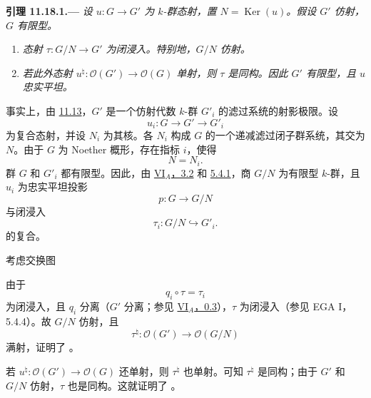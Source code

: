 \medskip
{}\label{lem:sga3-VIB-11.18.1}%
\noindent\textbf{引理 11.18.1.---}
\emph{设 \(u:G\to G'\) 为 \(k\)-群态射，置 \(N=\operatorname{Ker}(u)\)。假设 \(G'\) 仿射，\(G\) 有限型。}
\begin{enumerate}
\item[\textup{\SGAInlineRefTarget{lem:sga3-VIB-11.18.1:item:i}(i)}]
  \label{concl:sga3-VIB-11.18.1-i}%
  \emph{态射 \(\tau:G/N\to G'\) 为闭浸入。特别地，\(G/N\) 仿射。}

\item[\textup{(ii)}]
  \label{concl:sga3-VIB-11.18.1-ii}%
  \emph{若此外态射 \(u^\natural:\mathcal O(G')\to\mathcal O(G)\) 单射，则 \(\tau\) 是同构。因此 \(G'\) 有限型，且 \(u\) 忠实平坦。}
\end{enumerate}

事实上，由 \hyperref[prop:sga3-VIB-11.13]{11.13}，\(G'\) 是一个仿射代数 \(k\)-群 \(G'_i\) 的滤过系统的射影极限。设
\[
  u_i:G\longrightarrow G'\longrightarrow G'_i
\]
为复合态射，并设 \(N_i\) 为其核。各 \(N_i\) 构成 \(G\) 的一个递减滤过闭子群系统，其交为 \(N\)。由于 \(G\) 为 Noether 概形，存在指标 \(i\)，使得
\[
  N=N_i.
\]
群 \(G\) 和 \(G'_i\) 都有限型。因此，由 \hyperref[thm:sga3-VIA-3.2]{VI\(_A\)，3.2} 和 \hyperref[prop:sga3-VIA-5.4.1]{5.4.1}，商 \(G/N\) 为有限型 \(k\)-群，且 \(u_i\) 为忠实平坦投影
\[
  p:G\longrightarrow G/N
\]
与闭浸入
\[
  \tau_i:G/N\hookrightarrow G'_i.
\]
的复合。

考虑交换图
\begin{center}
  \label{diag:sga3-VIB-11.18.1-closed-immersion}%
\end{center}
由于
\[
  q_i\circ\tau=\tau_i
\]
为闭浸入，且 \(q_i\) 分离\textup{（\(G'\) 分离；参见 \hyperref[sga3:VIA:0.3]{VI\(_A\)，0.3}）}，\(\tau\) 为闭浸入\textup{（参见 EGA I，5.4.4）}。故 \(G/N\) 仿射，且
\[
  \tau^\natural:\mathcal O(G')\longrightarrow
    \mathcal O(G/N)
\]
满射，证明了 \textup{}。

若 \(u^\natural:\mathcal O(G')\to\mathcal O(G)\) 还单射，则 \(\tau^\natural\) 也单射。可知 \(\tau^\natural\) 是同构；由于 \(G'\) 和 \(G/N\) 仿射，\(\tau\) 也是同构。这就证明了 \textup{}。

